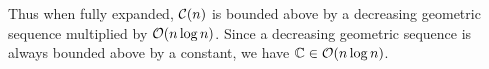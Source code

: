 Thus when fully expanded, $\mathcal C(n)$ is bounded above by a decreasing geometric sequence multiplied by $\mathcal O(n \log n)$. Since a decreasing geometric sequence is always bounded above by a constant, we have ${\mathbb C} \in \mathcal O(n \log n)$.









